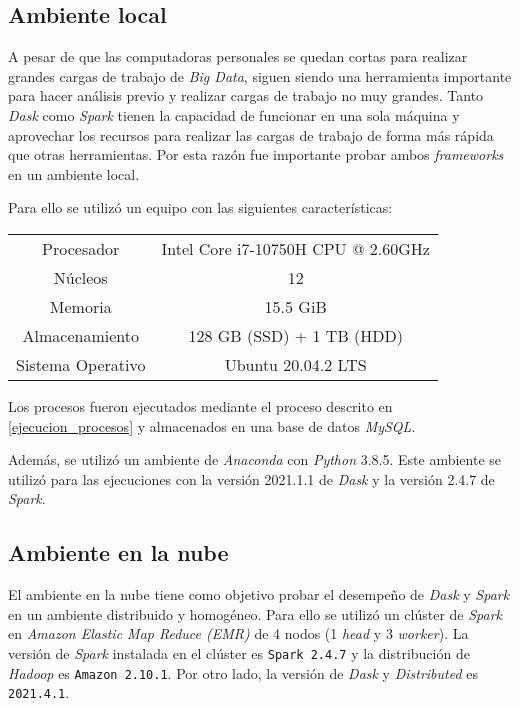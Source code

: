 \subsection{Ambiente local}

A pesar de que las computadoras personales se quedan cortas para realizar grandes cargas de trabajo de \textit{Big Data}, siguen siendo una herramienta importante para hacer análisis previo y realizar cargas de trabajo no muy grandes. Tanto \textit{Dask} como \textit{Spark} tienen la capacidad de funcionar en una sola máquina y aprovechar los recursos para realizar las cargas de trabajo de forma más rápida que otras herramientas. Por esta razón fue importante probar ambos \textit{frameworks} en un ambiente local. 

Para ello se utilizó un equipo con las siguientes características:

\begin{center}
\begin{tabular}{|c|c|}
 \hline
  Procesador & Intel Core i7-10750H CPU @ 2.60GHz \\ 
  Núcleos & 12 \\
  Memoria & 15.5 GiB \\ 
  Almacenamiento & 128 GB (SSD) + 1 TB (HDD) \\ 
  Sistema Operativo & Ubuntu 20.04.2 LTS \\
  \hline
\end{tabular}
\end{center}

Los procesos fueron ejecutados mediante el proceso descrito en \ref{ejecucion_procesos} y almacenados en una base de datos \textit{MySQL}.

Además, se utilizó un ambiente de \textit{Anaconda} con \textit{Python} 3.8.5. Este ambiente se utilizó para las ejecuciones con la versión 2021.1.1 de \textit{Dask} y la versión 2.4.7 de \textit{Spark}. 

\subsection{Ambiente en la nube}

El ambiente en la nube tiene como objetivo probar el desempeño de \textit{Dask} y \textit{Spark} en un ambiente distribuido y homogéneo. Para ello se utilizó un clúster de \textit{Spark} en \textit{Amazon Elastic Map Reduce (EMR)} de 4 nodos (1 \textit{head} y 3 \textit{worker}). La versión de \textit{Spark} instalada en el clúster es \texttt{Spark 2.4.7} y la distribución de \textit{Hadoop} es \texttt{Amazon 2.10.1}. Por otro lado, la versión de \textit{Dask} y \textit{Distributed} es \texttt{2021.4.1}. 


